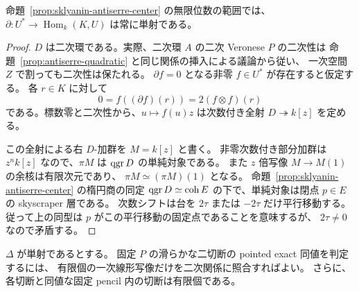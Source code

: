 \begin{lemma}[持上げ変更の単射性]
\label{lem:pencil-lift-injective}
命題~\ref{prop:sklyanin-antiserre-center} の無限位数の範囲では、
$\partial:U^*\to\operatorname{Hom}_k(K,U)$ は常に単射である。
\end{lemma}
\begin{proof}
$D$ は二次環である。実際、二次環 $A$ の二次 Veronese $P$ の二次性は
命題~\ref{prop:antiserre-quadratic} と同じ関係の挿入による議論から従い、
一次空間 $Z$ で割っても二次性は保たれる。
$\partial f=0$ となる非零 $f\in U^*$ が存在すると仮定する。
各 $r\in K$ に対して
\[
 0=f((\partial f)(r))=2(f\otimes f)(r)
\]
である。標数零と二次性から、$u\mapsto f(u)z$ は次数付き全射
$D\twoheadrightarrow k[z]$ を定める。

この全射による右 $D$-加群を $M=k[z]$ と書く。
非零次数付き部分加群は $z^n k[z]$ なので、$\pi M$ は $\operatorname{qgr} D$ の単純対象である。
また $z$ 倍写像 $M\to M(1)$ の余核は有限次元であり、
$\pi M\simeq(\pi M)(1)$ となる。
命題~\ref{prop:sklyanin-antiserre-center} の楕円商の同定
$\operatorname{qgr} D\simeq\operatorname{coh} E$ の下で、単純対象は閉点 $p\in E$ の skyscraper 層である。
次数シフトは台を $2\tau$ または $-2\tau$ だけ平行移動する。
従って上の同型は $p$ がこの平行移動の固定点であることを意味するが、
$2\tau\ne0$ なので矛盾する。
\end{proof}

\begin{proposition}
\label{prop:pencil-finite-candidates}
$\Delta$ が単射であるとする。
固定 $P$ の滑らかな二切断の pointed exact 同値を判定するには、
有限個の一次線形写像だけを二次関係に照合すればよい。
さらに、各切断と同値な固定 pencil 内の切断は有限個である。
\end{proposition}

